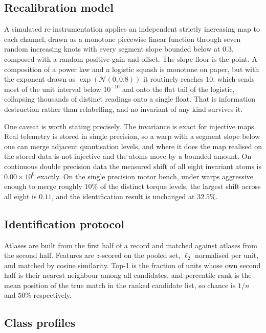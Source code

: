 \documentclass[11pt]{article}
\begin{document}
\subsection{Recalibration model}

A simulated re-instrumentation applies an independent strictly increasing map
to each channel, drawn as a monotone piecewise linear function through seven
random increasing knots with every segment slope bounded below at $0.3$,
composed with a random positive gain and offset. The slope floor is the point.
A composition of a power law and a logistic squash is monotone on paper, but
with the exponent drawn as $\exp(\mathcal{N}(0,0.8))$ it routinely reaches
$10$, which sends most of the unit interval below $10^{-10}$ and onto the flat
tail of the logistic, collapsing thousands of distinct readings onto a single
float. That is information destruction rather than relabelling, and no
invariant of any kind survives it.

One caveat is worth stating precisely. The invariance is exact for injective
maps. Real telemetry is stored in single precision, so a warp with a segment
slope below one can merge adjacent quantisation levels, and where it does the
map realised on the stored data is not injective and the atoms move by a
bounded amount. On continuous double precision data the measured shift of all
eight invariant atoms is $0.00\times10^{0}$ exactly. On the single precision
motor bench, under warps aggressive enough to merge roughly $10\%$ of the
distinct torque levels, the largest shift across all eight is $0.11$, and the
identification result is unchanged at $32.5\%$.

\subsection{Identification protocol}

Atlases are built from the first half of a record and matched against atlases
from the second half. Features are $z$-scored on the pooled set, $\ell_2$
normalised per unit, and matched by cosine similarity. Top-1 is the fraction of
units whose own second half is their nearest neighbour among all candidates,
and percentile rank is the mean position of the true match in the ranked
candidate list, so chance is $1/n$ and $50\%$ respectively.

\subsection{Class profiles}
\end{document}

